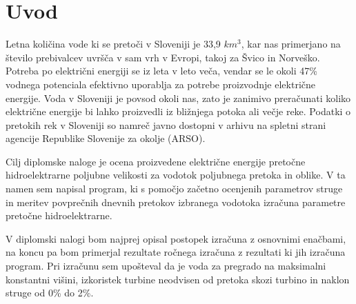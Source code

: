 
\chapter{Uvod}\label{sec: Uvod}
\thispagestyle{fancy}



Letna količina vode ki se pretoči v Sloveniji je 33,9 $km^{3}$, kar nas primerjano na število prebivalcev uvršča v sam vrh v Evropi, takoj za Švico in Norveško. Potreba po električni energiji se iz leta v leto veča, vendar se le okoli 47\% vodnega potenciala efektivno uporablja za potrebe proizvodnje električne energije. Voda v Sloveniji je povsod okoli nas, zato je zanimivo preračunati koliko električne energije bi lahko proizvedli iz bližnjega potoka ali večje reke. Podatki o pretokih rek v Sloveniji so namreč javno dostopni v arhivu na spletni strani agencije Republike Slovenije za okolje (ARSO). \cite{HEnaSrednjiSavi}


Cilj diplomske naloge je ocena proizvedene električne energije pretočne hidroelektrarne poljubne velikosti za vodotok poljubnega pretoka in oblike. V ta namen sem napisal program, ki s pomočjo začetno ocenjenih parametrov struge in meritev povprečnih dnevnih pretokov izbranega vodotoka izračuna parametre pretočne hidroelektrarne. 


V diplomski nalogi bom najprej opisal postopek izračuna z osnovnimi enačbami, na koncu pa bom primerjal rezultate ročnega izračuna z rezultati ki jih izračuna program. Pri izračunu sem upošteval da je voda za pregrado na maksimalni konstantni višini, izkoristek turbine neodvisen od pretoka skozi turbino in naklon struge od 0\% do 2\%.



